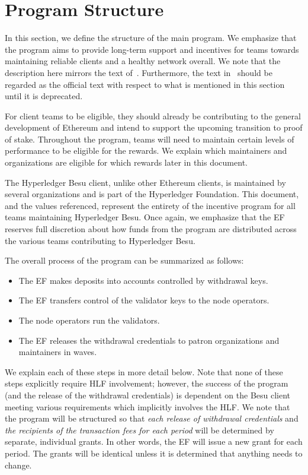 
\section{Program Structure} \label{sec:structure}
In this section, we define the structure of the main program.  We emphasize that the program aims to provide long-term support and incentives for teams towards maintaining reliable clients and a healthy network overall.  We note that the description here mirrors the text of~\cite{OfficialNotes}.  Furthermore, the text in~\cite{OfficialNotes} should be regarded as the official text with respect to what is mentioned in this section until it is deprecated.

For client teams to be eligible, they should already be contributing to the general development of Ethereum and intend to support the upcoming transition to proof of stake. Throughout the program, teams will need to maintain certain levels of performance to be eligible for the rewards.  We explain which maintainers and organizations are eligible for which rewards later in this document.

The Hyperledger Besu client, unlike other Ethereum clients, is maintained by several organizations and is part of the Hyperledger Foundation. This document, and the values referenced, represent the entirety of the incentive program for all teams maintaining Hyperledger Besu. Once again, we emphasize that the EF reserves full discretion about how funds from the program are distributed across the various teams contributing to Hyperledger Besu.

The overall process of the program can be summarized as follows:
\begin{itemize}
\item The EF makes deposits into accounts controlled by withdrawal keys.
\item The EF transfers control of the validator keys to the node operators.
\item The node operators run the validators.
\item The EF releases the withdrawal credentials to patron organizations and maintainers in waves.
\end{itemize}

We explain each of these steps in more detail below.  Note that none of these steps explicitly require HLF involvement; however, the success of the program (and the release of the withdrawal credentials) is dependent on the Besu client meeting various requirements which implicitly involves the HLF.  We note that the program will be structured so that \emph{each release of withdrawal credentials} and \emph{the recipients of the transaction fees for each period} will be determined by separate, individual grants.  In other words, the EF will issue a new grant for each period.  The grants will be identical unless it is determined that anything needs to change.

